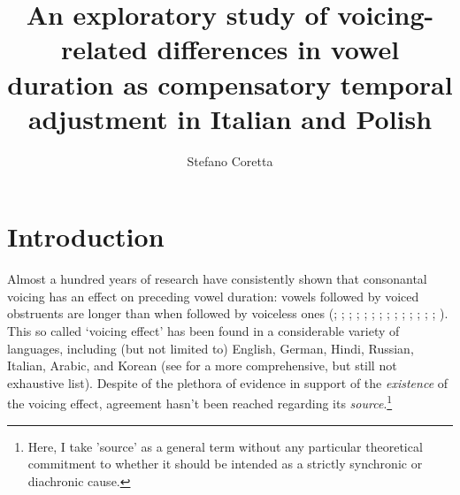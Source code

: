 \documentclass[12pt,]{article}
\title{An exploratory study of voicing-related differences in vowel duration as
compensatory temporal adjustment in Italian and Polish}
\author{Stefano Coretta}
\date{}
\let\rmarkdownfootnote\footnote%
\def\footnote{\protect\rmarkdownfootnote}
\begin{document}
\maketitle

\hypertarget{introduction}{%
\section{Introduction}\label{introduction}}

\label{s:intro}

Almost a hundred years of research have consistently shown that
consonantal voicing has an effect on preceding vowel duration: vowels
followed by voiced obstruents are longer than when followed by voiceless
ones (\citealt{meyer1904}; \citealt{heffner1937}; \citealt{house1953};
\citealt{belasco1953}; \citealt{peterson1960}; \citealt{halle1967};
\citealt{chen1970}; \citealt{klatt1973}; \citealt{lisker1974};
\citealt{laeufer1992}; \citealt{fowler1992}; \citealt{hussein1994};
\citealt{lampp2004}; \citealt{warren2005}; \citealt{durvasula2012}).
This so called `voicing effect' has been found in a considerable variety
of languages, including (but not limited to) English, German, Hindi,
Russian, Italian, Arabic, and Korean (see \citealt{maddieson1976} for a
more comprehensive, but still not exhaustive list). Despite of the
plethora of evidence in support of the \emph{existence} of the voicing
effect, agreement hasn't been reached regarding its
\emph{source}.\footnote{Here, I take 'source' as a general term without any particular theoretical commitment to whether it should be intended as a strictly synchronic or diachronic cause.
}
\end{document}
